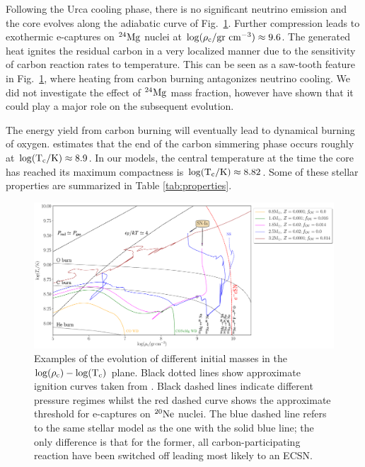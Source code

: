 \documentclass[../../main/thesis_msc.tex]{subfiles}
\begin{document}
        Following the Urca cooling phase, there is no significant neutrino emission and the core evolves along the adiabatic curve of Fig.\,  \ref{fig:RhoT}. Further compression leads to exothermic e-captures on $\rm ^{24}Mg$ nuclei at $\rm \log(\rho_c/gr \ cm^{-3}) \approx 9.6$. The generated heat ignites the residual carbon in a very localized manner due to the sensitivity of carbon reaction rates to temperature. This can be seen as a saw-tooth feature in Fig.\, \ref{fig:RhoT}, where heating from carbon burning antagonizes neutrino cooling. We did not investigate the effect of $\rm ^{24}Mg$ mass fraction, however \cite{Gutierrez2005} have shown that it could play a major role on the subsequent evolution.
        
        The energy yield from carbon burning will eventually lead to dynamical burning of oxygen. \cite{Woosley2004} estimates that the end of the carbon simmering phase occurs roughly at $\rm \log(T_c/ \rm K) \approx 8.9$. In our models, the central temperature at the time the core has reached its maximum compactness is $\rm \log(T_c / \rm K) \approx 8.82$. Some of these stellar properties are summarized in Table \ref{tab:properties}.
        
        \begin{figure}[ht!]
            \centering
            \includegraphics[width=\textwidth]{../figures/chapter4/RhoT.pdf}
            \caption{Examples of the evolution of different initial masses in the $\rm \log(\rho_{\rm c})-\log(T_{\rm c})$ plane. Black dotted lines show approximate ignition curves taken from \mesa. Black dashed lines indicate different pressure regimes whilst the red dashed curve shows the approximate threshold for e-captures on $\rm ^{20}Ne$ nuclei. The blue dashed line refers to the same stellar model as the one with the solid blue line; the only difference is that for the former, all carbon-participating reaction have been switched off leading most likely to an ECSN.}
            \label{fig:RhoT}
        \end{figure}
        
\end{document}
